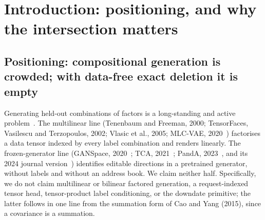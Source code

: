 \documentclass{article} %
\begin{document}
\begin{abstract}
On a transition instrument over the same mazes the store does compose held-out $n$-way
transitions, 0.7246 against 0.4035 for the best matched rival over three seeds with every %
landscape control collapsing, although no matched arm, the store included, yields a valid
chained rollout.
We conclude with what the naive unit cannot do and with the one measured clue toward a
dynamical successor: the store is exactly the zero-dynamics limit of a settling unit, its zero-step arm bit-identical to the static read. %
\end{abstract}

\section{Introduction: positioning, and why the intersection matters}
\label{sec:intro}

\subsection{Positioning: compositional generation is crowded; with data-free exact deletion it is empty}
\label{sec:positioning}

Generating held-out combinations of factors is a long-standing and active problem~\citep{du2020compositional,liu2022compositional,du2023reduce,okawa2023compositional}. The multilinear line (Tenenbaum and Freeman, 2000\nocite{tenenbaum2000separating}; TensorFaces,
Vasilescu and Terzopoulos, 2002\nocite{vasilescu2002tensorfaces}; Vlasic et al., 2005\nocite{vlasic2005face}; MLC-VAE, 2020~\citep{georgopoulos2020multilinear}) factorises a data tensor
indexed by every label combination and renders linearly. The frozen-generator line (GANSpace,
2020~\citep{harkonen2020ganspace}; TCA, 2021~\citep{oldfield2021tensor}; PandA, 2023~\citep{oldfield2023panda}, and its 2024 journal version~\citep{oldfield2024bilinear}) identifies editable directions in a
pretrained generator, without labels and without an address book. We claim neither half.
Specifically, we do not claim multilinear or bilinear factored generation, a request-indexed
tensor head, tensor-product label conditioning, or the downdate primitive; the latter follows
in one line from the summation form of Cao and Yang (2015)\nocite{cao2015towards}, since a covariance is a summation.
\end{document}
